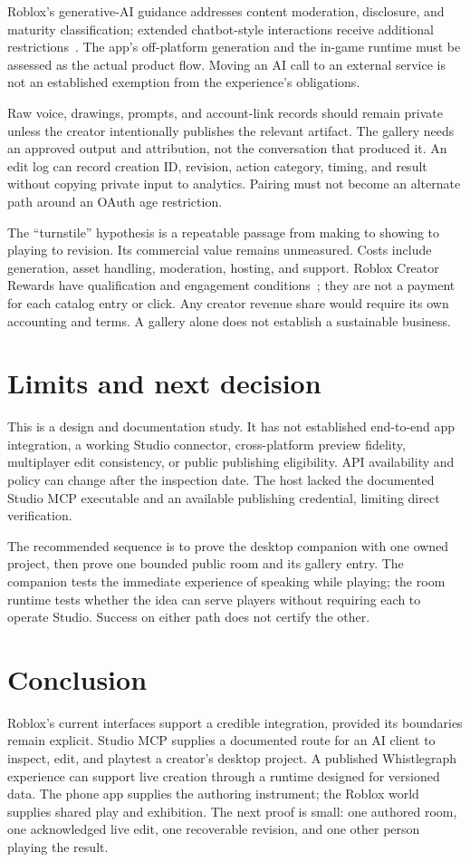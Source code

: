 \documentclass[10pt,letterpaper,twocolumn]{article}
\begin{document}
Roblox's generative-AI guidance addresses content moderation, disclosure, and maturity classification; extended chatbot-style interactions receive additional restrictions~\cite{ai}. The app's off-platform generation and the in-game runtime must be assessed as the actual product flow. Moving an AI call to an external service is not an established exemption from the experience's obligations.

Raw voice, drawings, prompts, and account-link records should remain private unless the creator intentionally publishes the relevant artifact. The gallery needs an approved output and attribution, not the conversation that produced it. An edit log can record creation ID, revision, action category, timing, and result without copying private input to analytics. Pairing must not become an alternate path around an OAuth age restriction.

The ``turnstile'' hypothesis is a repeatable passage from making to showing to playing to revision. Its commercial value remains unmeasured. Costs include generation, asset handling, moderation, hosting, and support. Roblox Creator Rewards have qualification and engagement conditions~\cite{rewards}; they are not a payment for each catalog entry or click. Any creator revenue share would require its own accounting and terms. A gallery alone does not establish a sustainable business.

\section{Limits and next decision}
This is a design and documentation study. It has not established end-to-end app integration, a working Studio connector, cross-platform preview fidelity, multiplayer edit consistency, or public publishing eligibility. API availability and policy can change after the inspection date. The host lacked the documented Studio MCP executable and an available publishing credential, limiting direct verification.

The recommended sequence is to prove the desktop companion with one owned project, then prove one bounded public room and its gallery entry. The companion tests the immediate experience of speaking while playing; the room runtime tests whether the idea can serve players without requiring each to operate Studio. Success on either path does not certify the other.

\section{Conclusion}
Roblox's current interfaces support a credible integration, provided its boundaries remain explicit. Studio MCP supplies a documented route for an AI client to inspect, edit, and playtest a creator's desktop project. A published Whistlegraph experience can support live creation through a runtime designed for versioned data. The phone app supplies the authoring instrument; the Roblox world supplies shared play and exhibition. The next proof is small: one authored room, one acknowledged live edit, one recoverable revision, and one other person playing the result.


\end{document}
